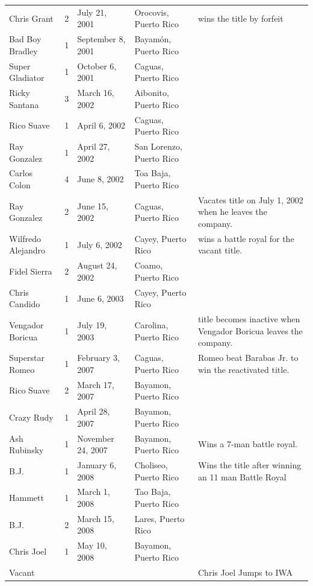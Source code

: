 \documentclass{article}
\begin{document}
\begin{tabular}{lllll}
Chris Grant & 2 & July 21, 2001 & Orocovis, Puerto Rico & wins the title by forfeit \\
Bad Boy Bradley & 1 & September 8, 2001 & Bayamón, Puerto Rico &  \\
Super Gladiator & 1 & October 6, 2001 & Caguas, Puerto Rico &  \\
Ricky Santana & 3 & March 16, 2002 & Aibonito, Puerto Rico &  \\
Rico Suave & 1 & April 6, 2002 & Caguas, Puerto Rico &  \\
Ray Gonzalez & 1 & April 27, 2002 & San Lorenzo, Puerto Rico &  \\
Carlos Colon & 4 & June 8, 2002 & Toa Baja, Puerto Rico &  \\
Ray Gonzalez & 2 & June 15, 2002 & Caguas, Puerto Rico & Vacates title on July 1, 2002 when he leaves the company. \\
Wilfredo Alejandro & 1 & July 6, 2002 & Cayey, Puerto Rico & wins a battle royal for the vacant title. \\
Fidel Sierra & 2 & August 24, 2002 & Coamo, Puerto Rico &  \\
Chris Candido & 1 & June 6, 2003 & Cayey, Puerto Rico &  \\
Vengador Boricua & 1 & July 19, 2003 & Carolina, Puerto Rico & title becomes inactive when Vengador Boricua leaves the company. \\
Superstar Romeo & 1 & February 3, 2007 & Caguas, Puerto Rico & Romeo beat Barabas Jr. to win the reactivated title. \\
Rico Suave & 2 & March 17, 2007 & Bayamon, Puerto Rico &  \\
Crazy Rudy & 1 & April 28, 2007 & Bayamon, Puerto Rico &  \\
Ash Rubinsky & 1 & November 24, 2007 & Bayamon, Puerto Rico & Wins a 7-man battle royal. \\
B.J. & 1 & January 6, 2008 & Choliseo, Puerto Rico & Wins the title after winning an 11 man Battle Royal \\
Hammett & 1 & March 1, 2008 & Tao Baja, Puerto Rico &  \\
B.J. & 2 & March 15, 2008 & Lares, Puerto Rico &  \\
Chris Joel & 1 & May 10, 2008 & Bayamon, Puerto Rico &  \\
Vacant &  &  &  & Chris Joel Jumps to IWA \\
\bottomrule
\end{tabular}
\end{document}
